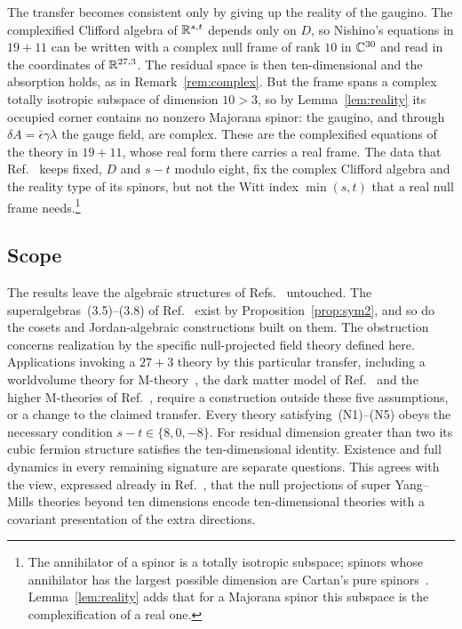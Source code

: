 \begin{remark}
\label{rem:transfercomplex}
The transfer becomes consistent only by giving up the reality of the gaugino. The complexified Clifford algebra of $\mathbb{R}^{s,t}$ depends only on $D$, so Nishino's equations in $19+11$ can be written with a complex null frame of rank $10$ in $\mathbb{C}^{30}$ and read in the coordinates of $\mathbb{R}^{27,3}$. The residual space is then ten-dimensional and the absorption holds, as in Remark~\ref{rem:complex}. But the frame spans a complex totally isotropic subspace of dimension $10>3$, so by Lemma~\ref{lem:reality} its occupied corner contains no nonzero Majorana spinor: the gaugino, and through $\delta A=\bar\epsilon\gamma\lambda$ the gauge field, are complex. These are the complexified equations of the theory in $19+11$, whose real form there carries a real frame. The data that Ref.~\cite{RiosMarraniChester2019} keeps fixed, $D$ and $s-t$ modulo eight, fix the complex Clifford algebra and the reality type of its spinors, but not the Witt index $\min(s,t)$ that a real null frame needs.\footnote{The annihilator of a spinor is a totally isotropic subspace; spinors whose annihilator has the largest possible dimension are Cartan's pure spinors~\cite{Chevalley1954,BudinichTrautman1988}. Lemma~\ref{lem:reality} adds that for a Majorana spinor this subspace is the complexification of a real one.}
\end{remark}

\subsection{Scope}
\label{ssec:scope}

The results leave the algebraic structures of Refs.~\cite{RiosMarraniChester2019,TruiniMarraniRios2019,MarraniRiosChester2023} untouched. The superalgebras~(3.5)--(3.8) of Ref.~\cite{RiosMarraniChester2019} exist by Proposition~\ref{prop:sym2}, and so do the cosets and Jordan-algebraic constructions built on them. The obstruction concerns realization by the specific null-projected field theory defined here. Applications invoking a $27+3$ theory by this particular transfer, including a worldvolume theory for M-theory~\cite{RiosMarraniChester2020}, the dark matter model of Ref.~\cite{PaduroiuRiosMarraniChester2021} and the higher M-theories of Ref.~\cite{Banerjee2024}, require a construction outside these five assumptions, or a change to the claimed transfer. Every theory satisfying~(N1)--(N5) obeys the necessary condition $s-t\in\{8,0,-8\}$. For residual dimension greater than two its cubic fermion structure satisfies the ten-dimensional identity. Existence and full dynamics in every remaining signature are separate questions. This agrees with the view, expressed already in Ref.~\cite{RudychevSezginSundell1998}, that the null projections of super Yang--Mills theories beyond ten dimensions encode ten-dimensional theories with a covariant presentation of the extra directions.

